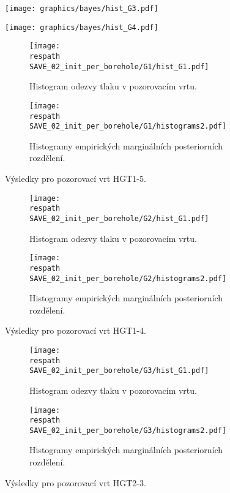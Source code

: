 \documentclass{article}
\newcommand{\respath}{results/}
\begin{document}
\cleardoublepage
    \begin{subfigure}[t]{0.495\textwidth}
      \texttt{[image: graphics/bayes/hist\_G3.pdf]}
    \end{subfigure}
    \begin{subfigure}[t]{0.495\textwidth}
      \texttt{[image: graphics/bayes/hist\_G4.pdf]}
    \end{subfigure}
\begin{figure}[htb!]
    \centering
    \begin{subfigure}[t]{0.495\textwidth}
      \texttt{[image: \\respath SAVE\_02\_init\_per\_borehole/G1/hist\_G1.pdf]}
      \caption{Histogram odezvy tlaku v pozorovacím vrtu.}
      \label{fig:hist_g1_lin}
    \end{subfigure}
    \begin{subfigure}[t]{0.495\textwidth}
      \texttt{[image: \\respath SAVE\_02\_init\_per\_borehole/G1/histograms2.pdf]}
      \caption{Histogramy empirických marginálních posteriorních rozdělení.}
      \label{fig:hist_g1_lin_params}
    \end{subfigure}
    \caption{Výsledky pro pozorovací vrt HGT1-5.}
    \label{fig:hist_G1}
\end{figure}

\begin{figure}[htb!]
    \centering
    \begin{subfigure}[t]{0.495\textwidth}
      \texttt{[image: \\respath SAVE\_02\_init\_per\_borehole/G2/hist\_G1.pdf]}
      \caption{Histogram odezvy tlaku v pozorovacím vrtu.}
      \label{fig:hist_g2_lin}
    \end{subfigure}
    \begin{subfigure}[t]{0.495\textwidth}
      \texttt{[image: \\respath SAVE\_02\_init\_per\_borehole/G2/histograms2.pdf]}
      \caption{Histogramy empirických marginálních posteriorních rozdělení.}
      \label{fig:hist_g2_lin_params}
    \end{subfigure}
    \caption{Výsledky pro pozorovací vrt HGT1-4.}
    \label{fig:hist_G2}
\end{figure}

\begin{figure}[htb!]
    \centering
    \begin{subfigure}[t]{0.495\textwidth}
      \texttt{[image: \\respath SAVE\_02\_init\_per\_borehole/G3/hist\_G1.pdf]}
      \caption{Histogram odezvy tlaku v pozorovacím vrtu.}
      \label{fig:hist_g3_lin}
    \end{subfigure}
    \begin{subfigure}[t]{0.495\textwidth}
      \texttt{[image: \\respath SAVE\_02\_init\_per\_borehole/G3/histograms2.pdf]}
      \caption{Histogramy empirických marginálních posteriorních rozdělení.}
      \label{fig:hist_g3_lin_params}
    \end{subfigure}
    \caption{Výsledky pro pozorovací vrt HGT2-3.}
    \label{fig:hist_G3}
\end{figure}
\end{document}
